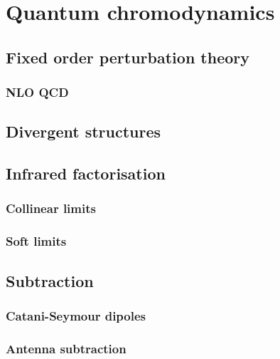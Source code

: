 \documentclass[main.tex]{subfiles}
\begin{document}
\chapter{Quantum chromodynamics}
\label{chapter:qcd}
\section{Fixed order perturbation theory}
\subsection{NLO QCD}
\section{Divergent structures}
\section{Infrared factorisation}
\subsection{Collinear limits}
\subsection{Soft limits}
\section{Subtraction}
\subsection{Catani-Seymour dipoles}
\subsection{Antenna subtraction}
\end{document}
